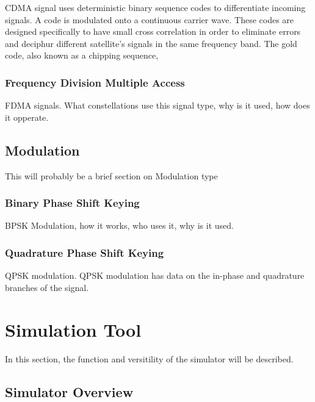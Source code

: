 \documentclass[12pt]{report}
\begin{document}
CDMA signal uses deterministic binary sequence codes to differentiate incoming signals. A code is modulated onto a continuous carrier wave. These codes are designed specifically to have small cross correlation in order to eliminate errors and deciphur different satellite's signals in the same frequency band. The gold code, also known as a chipping sequence, 

\subsection{Frequency Division Multiple Access}
FDMA signals. What constellations use this signal type, why is it used, how does it opperate. 

\section{Modulation}
This will probably be a brief section on Modulation type

\subsection{Binary Phase Shift Keying}

BPSK Modulation, how it works, who uses it, why is it used.

\subsection{Quadrature Phase Shift Keying}

QPSK modulation. QPSK modulation has data on the in-phase and quadrature branches of the signal.



\chapter {Simulation Tool}
In this section, the function and versitility of the simulator will be described.

\section{Simulator Overview}
\end{document}

